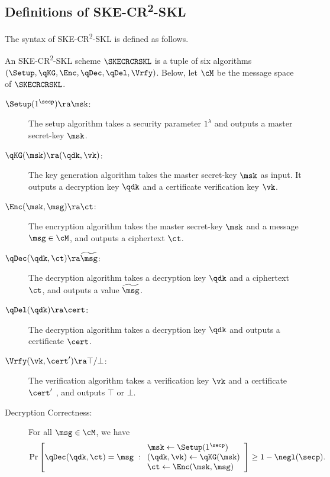\subsection{Definitions of
SKE-CR\textsuperscript{2}-SKL}\label{def:ske-cr2}
The syntax of SKE-CR\textsuperscript{2}-SKL is defined as follows. 
\begin{definition}
An SKE-CR\textsuperscript{2}-SKL scheme $\SKECRCRSKL$ is a tuple of
six algorithms $(\Setup,\qKG, \Enc, \qDec, \allowbreak \qDel, \Vrfy)$. 
Below, let $\cM$  be the message space of $\SKECRCRSKL$. 
\begin{description}
\item[$\Setup(1^\secp)\ra\msk$:] The setup algorithm takes a
security parameter $1^\lambda$ and outputs a master secret-key
$\msk$.

\item[$\qKG(\msk)\ra(\qdk,\vk)$:] The key generation algorithm
takes the master secret-key $\msk$ as input. It outputs a decryption
key $\qdk$ and a certificate verification key $\vk$.

\item[$\Enc(\msk,\msg)\ra\ct$:] The encryption algorithm takes the
master secret-key $\msk$ and a message $\msg \in \cM$, and outputs a
ciphertext $\ct$.

\item[$\qDec(\qdk,\ct)\ra\widetilde{\msg}$:] The decryption
algorithm takes a decryption key $\qdk$ and a ciphertext $\ct$,
and outputs a value $\widetilde{\msg}$.


\item[$\qDel(\qdk)\ra\cert$:] The decryption
algorithm takes a decryption key $\qdk$ and outputs a
certificate $\cert$.

\item[$\Vrfy(\vk, \cert')\ra\top/\bot$:] The verification
algorithm takes a verification key $\vk$ and a certificate $\cert'$
, and outputs $\top$ or $\bot$.

\item[Decryption Correctness:] For all $\msg \in \cM$, we have
\begin{align}
\Pr\left[
\qDec(\qdk, \ct) \allowbreak = \msg
\ :
\begin{array}{ll}
\msk\gets\Setup(1^\secp)\\
(\qdk,\vk)\gets\qKG(\msk)\\
\ct\gets\Enc(\msk,\msg)
\end{array}
\right] 
\ge 1-\negl(\secp).
\end{align}


\end{description}
\end{definition}

